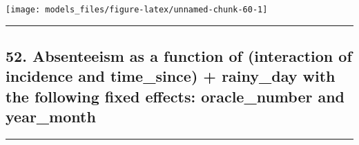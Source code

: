 \documentclass[]{article}
\begin{document}
\begin{center}\texttt{[image: models\_files/figure-latex/unnamed-chunk-60-1]} \end{center}

\newpage

\begin{center}\rule{0.5\linewidth}{\linethickness}\end{center}

\subsection{52. Absenteeism as a function of (interaction of incidence
and time\_since) + rainy\_day with the following fixed effects:
oracle\_number and
year\_month}\label{absenteeism-as-a-function-of-interaction-of-incidence-and-time_since-rainy_day-with-the-following-fixed-effects-oracle_number-and-year_month}

\begin{center}\rule{0.5\linewidth}{\linethickness}\end{center}
\end{document}
